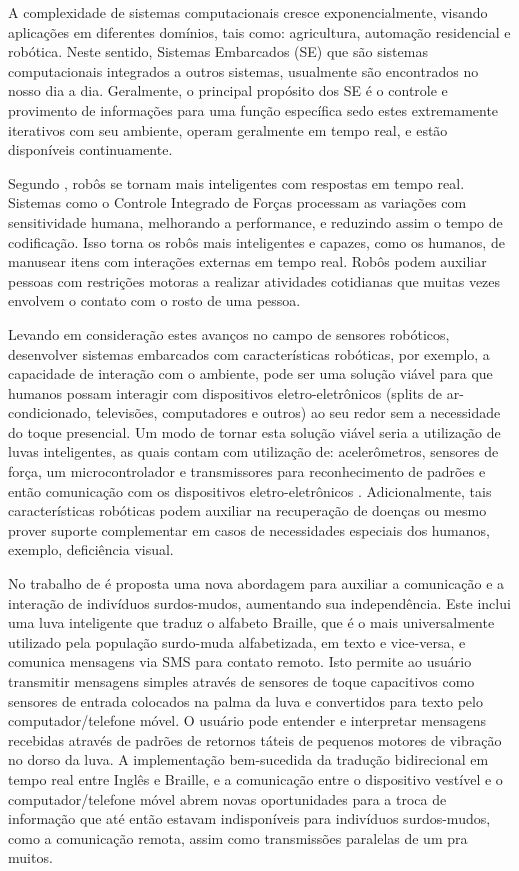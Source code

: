 \label{chapter:intro}
A complexidade de sistemas computacionais cresce exponencialmente, visando aplicações em diferentes domínios, tais como: agricultura, automação residencial e robótica. Neste sentido, Sistemas Embarcados (SE) que são sistemas computacionais integrados a outros sistemas, usualmente são encontrados no nosso dia a dia. Geralmente, o principal propósito dos SE é o controle e provimento de informações para uma função específica \cite{RAMESH:2012} sedo estes extremamente iterativos com seu ambiente, operam geralmente em tempo real, e estão disponíveis continuamente. 


Segundo , robôs se tornam mais inteligentes com respostas em tempo real. Sistemas como o Controle Integrado de Forças processam as variações com sensitividade humana, melhorando a performance, e reduzindo assim o tempo de codificação. Isso torna os robôs mais inteligentes e capazes, como os humanos, de manusear itens com interações externas em tempo real. Robôs podem auxiliar pessoas com restrições motoras a realizar atividades cotidianas que muitas vezes envolvem o contato com o rosto de uma pessoa.


Levando em consideração estes avanços no campo de sensores robóticos, desenvolver sistemas embarcados com características robóticas, por exemplo, a capacidade de interação com o ambiente, pode ser uma solução viável para que humanos possam interagir com dispositivos eletro-eletrônicos (splits de ar-condicionado, televisões, computadores e outros) ao seu redor sem a necessidade do toque presencial. Um modo de tornar esta solução viável seria a utilização de luvas inteligentes, as quais contam com utilização de: acelerômetros, sensores de força, um microcontrolador e transmissores \cite{WESTERFELD:2012} para reconhecimento de padrões e então comunicação com os dispositivos eletro-eletrônicos \cite{OFLYNN:2013} \cite{BERNIERI:2015} \cite{CHOUDHARY:2015}. Adicionalmente, tais características robóticas podem auxiliar na recuperação de doenças ou mesmo prover suporte complementar em casos de necessidades especiais dos humanos, exemplo, deficiência visual.


No trabalho de  é proposta uma nova abordagem para auxiliar a comunicação e a interação de indivíduos surdos-mudos, aumentando sua independência. Este inclui uma luva inteligente que traduz o alfabeto Braille, que é o mais universalmente utilizado pela população surdo-muda alfabetizada, em texto e vice-versa, e comunica mensagens via SMS para contato remoto. Isto permite ao usuário transmitir mensagens simples através de sensores de toque capacitivos como sensores de entrada colocados na palma da luva e convertidos para texto pelo computador/telefone móvel. O usuário pode entender e interpretar mensagens recebidas através de padrões de retornos táteis de pequenos motores de vibração no dorso da luva. A implementação bem-sucedida da tradução bidirecional em tempo real entre Inglês e Braille, e a comunicação entre o dispositivo vestível e o computador/telefone móvel abrem novas oportunidades para a troca de informação que até então estavam indisponíveis para indivíduos surdos-mudos, como a comunicação remota, assim como transmissões paralelas de um pra muitos.


